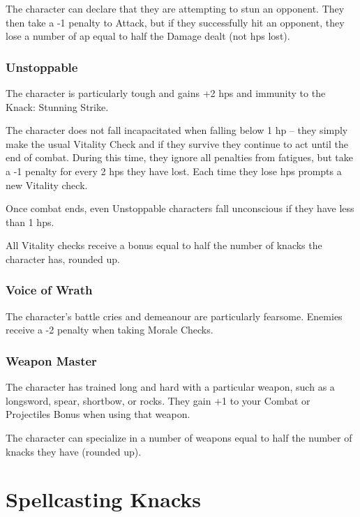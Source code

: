\begin{multicols}{2}
The character can declare that they are attempting to stun an opponent.
They then take a -1 penalty to Attack, but if they successfully hit an opponent, they lose a number of \gls{ap} equal to half the Damage dealt (not \glspl{hp} lost).

\subsubsection{Unstoppable}

The character is particularly tough and gains +2 \glspl{hp} and immunity to the Knack: Stunning Strike.

The character does not fall incapacitated when falling below 1 \gls{hp} -- they simply make the usual Vitality Check and if they survive they continue to act until the end of combat.
 During this time, they ignore all penalties from \glspl{fatigue}, but take a -1 penalty for every 2 \glspl{hp} they have lost.
Each time they lose \glspl{hp} prompts a new Vitality check.

Once combat ends, even Unstoppable characters fall unconscious if they have less than 1 \glspl{hp}.

All Vitality checks receive a bonus equal to half the number of knacks the character has, rounded up.

\subsubsection{Voice of Wrath}

The character's battle cries and demeanour are particularly fearsome.
Enemies receive a -2 penalty when taking Morale Checks.

\subsubsection{Weapon Master}

The character has trained long and hard with a particular weapon, such as a longsword, spear, shortbow, or rocks.
They gain +1 to your Combat or Projectiles Bonus when using that weapon.

The character can specialize in a number of weapons equal to half the number of knacks they have (rounded up).

\end{multicols}

\section{Spellcasting Knacks}


